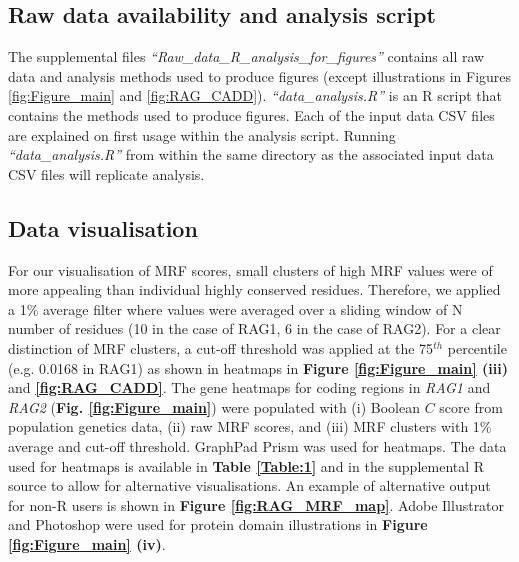 \documentclass[preprint,11pt,fleqn]{elsarticle}
\begin{document}
\subsection*{\textbf{Raw data availability and analysis script}}
\noindent The supplemental files \textit{``Raw\_data\_R\_analysis\_for\_figures''} contains all raw data and analysis methods used to produce figures (except illustrations in Figures \ref{fig:Figure_main} and \ref{fig:RAG_CADD}).
\textit{``data\_analysis.R''} is an R script that contains the methods used to produce figures. 
Each of the input data CSV files are explained on first usage within the analysis script.
Running \textit{``data\_analysis.R''} from within the same directory as the associated input data CSV files will replicate analysis.

\subsection*{\textbf{Data visualisation}}
\noindent For our visualisation of MRF scores, small clusters of high MRF values were of more appealing than individual highly conserved residues. 
Therefore, we applied a 1\% average filter where values were averaged over a sliding window of N number of residues (10 in the case of RAG1, 6 in the case of RAG2). 
For a clear distinction of MRF clusters, a cut-off threshold was applied at the 75$^{th}$ percentile (e.g. 0.0168 in RAG1) as shown in heatmaps in \textbf{Figure \ref{fig:Figure_main} (iii)} and \textbf{\ref{fig:RAG_CADD}}. 
The gene heatmaps for coding regions in \textit{RAG1} and \textit{RAG2} (\textbf{Fig. \ref{fig:Figure_main}}) were populated with (i) Boolean $C$ score from population genetics data, (ii) raw MRF scores, and (iii) MRF clusters with 1\% average and cut-off threshold. 
GraphPad Prism was used for heatmaps. 
The data used for heatmaps is available in \textbf{Table \ref{Table:1}} and in the supplemental R source to allow for alternative visualisations.
An example of alternative output for non-R users is shown in \textbf{Figure
\ref{fig:RAG_MRF_map}}. 
Adobe Illustrator and Photoshop were used for protein domain illustrations in \textbf{Figure \ref{fig:Figure_main} (iv)}.
\end{document}
